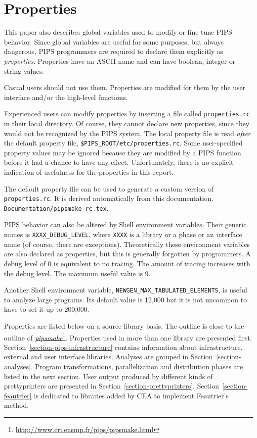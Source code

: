 \documentclass[a4paper]{report}
\newcommand{\LINK}[2]{\href{#2}{#1}\footnote{\url{#2}}\xspace}
\newcommand{\PIPSMAKE}{\LINK{\emph{pipsmake}}{http://www.cri.ensmp.fr/pips/pipsmake.html}\xspace}
\begin{document}
\section{Properties}

This paper also describes global variables used to modify or fine tune PIPS
behavior. Since global variables are useful for some purposes, but
always dangerous, PIPS programmers are required to declare them
explicitly as \emph{properties}. Properties have an ASCII name and can
have boolean, integer or string values.


Casual users should not use them. Properties are modified for them by
the user interface and/or the high-level functions.

Experienced users can modify properties by inserting a file called
\texttt{properties.rc} in their local directory. Of course, they cannot
declare new properties, since they would not be recognized by the PIPS
system. The local property file is read \emph{after} the default property
file, \verb+$PIPS_ROOT/etc/properties.rc+.
Some user-specified property
values may be ignored because they are modified by a PIPS function before
it had a chance to have any effect. Unfortunately, there is no explicit
indication of usefulness for the properties in this report.

The default property file can be used to generate a custom version of
\texttt{properties.rc}. It is derived automatically from this documentation,
\verb+Documentation/pipsmake-rc.tex+.

PIPS behavior can also be altered by Shell environment variables. Their
generic names is \verb+XXXX_DEBUG_LEVEL+, where \verb+XXXX+ is a library
or a phase or an interface name (of course, there are
exceptions). Theoretically these environment variables are also declared
as properties, but this is generally forgotten by programmers. A debug
level of 0 is equivalent to no tracing. The amount of tracing increases
with the debug level. The maximum useful value is 9.

Another Shell environment variable, \verb+NEWGEN_MAX_TABULATED_ELEMENTS+,
is useful to analyze large programs. Its default value is 12,000 but it is
not uncommon to have to set it up to 200,000.

Properties are listed below on a source library basis. The outline is
close to the outline of \PIPSMAKE{}.  Properties used in more than
one library are presented first. Section~\ref{section-pips-infrastructure}
contains information about infrastructure, external and user interface
libraries. Analyses are grouped in Section~\ref{section-analyses}. Program
transformations, parallelization and distribution phases are listed in the
next section. User output produced by different kinds of prettyprinters
are presented in Section~\ref{section-prettyprinters}.
Section~\ref{section-feautrier} is dedicated to libraries added by CEA to
implement Feautrier's method.
\end{document}

